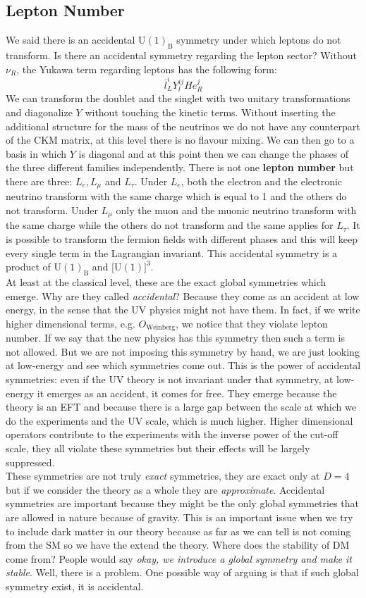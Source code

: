 \documentclass[../main.tex]{subfiles}
\begin{document}
\subsection{Lepton Number}
We said there is an accidental U$(1)_{\text{B}}$ symmetry under which leptons do not transform. Is there an accidental symmetry regarding the lepton sector? Without $\nu_R$, the Yukawa term regarding leptons has the following form:
\[
\overline{l}_L^iY_l^{ij}He_R^j
\]
We can transform the doublet and the singlet with two unitary transformations and diagonalize $Y$ without touching the kinetic terms. Without inserting the additional structure for the mass of the neutrinos we do not have any counterpart of the CKM matrix, at this level there is no flavour mixing. We can then go to a basis in which $Y$ is diagonal and at this point then we can change the phases of the three different families independently. There is not one \textbf{lepton number} but there are three: $L_e, L_\mu$ and $L_\tau$. Under $L_e$, both the electron and the electronic neutrino transform with the same charge which is equal to 1 and the others do not transform. Under $L_\mu$ only the muon and the muonic neutrino transform with the same charge while the others do not transform and the same applies for $L_\tau$. It is possible to transform the fermion fields with different phases and this will keep every single term in the Lagrangian invariant. This accidental symmetry is a product of U$(1)_{\text{B}}$ and [U$(1)]^3$.\\
At least at the classical level, these are the exact global symmetries which emerge. Why are they called \textit{accidental}? Because they come as an accident at low energy, in the sense that the UV physics might not have them. In fact, if we write higher dimensional terms, e.g. $O_{\text{Weinberg}}$, we notice that they violate lepton number. If we say that the new physics has this symmetry then such a term is not allowed. But we are not imposing this symmetry by hand, we are just looking at low-energy and see which symmetries come out. This is the power of accidental symmetries: even if the UV theory is not invariant under that symmetry, at low-energy it emerges as an accident, it comes for free. They emerge because the theory is an EFT and because there is a large gap between the scale at which we do the experiments and the UV scale, which is much higher. Higher dimensional operators contribute to the experiments with the inverse power of the cut-off scale, they all violate these symmetries but their effects will be largely suppressed.\\
These symmetries are not truly \textit{exact} symmetries, they are exact only at $D=4$ but if we consider the theory as a whole they are \textit{approximate}. Accidental symmetries are important because they might be the only global symmetries that are allowed in nature because of gravity. This is an important issue when we try to include dark matter in our theory because as far as we can tell is not coming from the SM so we have the extend the theory. Where does the stability of DM come from? People would say \textit{okay, we introduce a global symmetry and make it stable}. Well, there is a problem. One possible way of arguing is that if such global symmetry exist, it is accidental.
\end{document}
